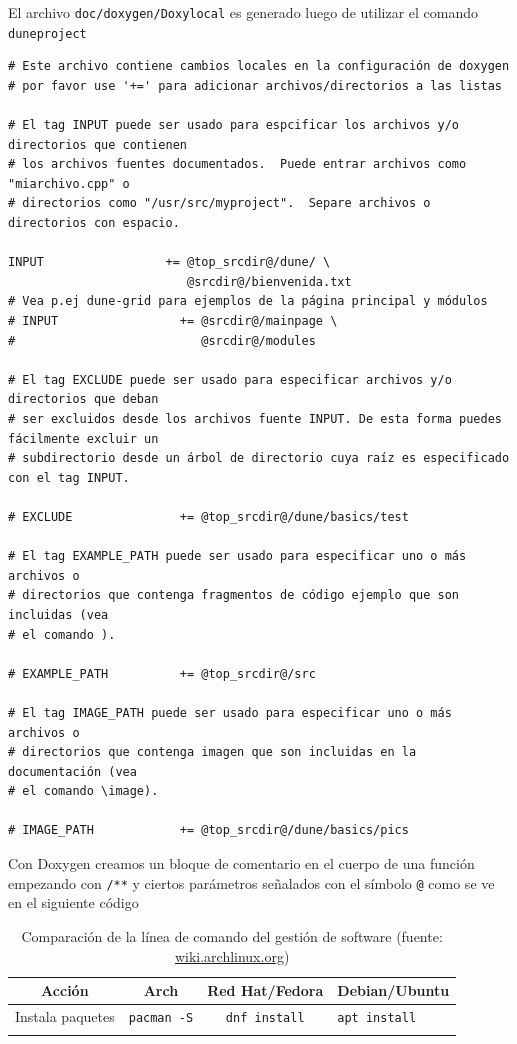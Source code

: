 \begin{frame}[fragile]
	El archivo \lstinline{doc/doxygen/Doxylocal} es generado luego de utilizar el comando \lstinline{duneproject}
	\begin{lstlisting}
# Este archivo contiene cambios locales en la configuración de doxygen
# por favor use '+=' para adicionar archivos/directorios a las listas

# El tag INPUT puede ser usado para espcificar los archivos y/o directorios que contienen  
# los archivos fuentes documentados.  Puede entrar archivos como "miarchivo.cpp" o
# directorios como "/usr/src/myproject".  Separe archivos o directorios con espacio.

INPUT                 += @top_srcdir@/dune/ \
                         @srcdir@/bienvenida.txt
# Vea p.ej dune-grid para ejemplos de la página principal y módulos
# INPUT                 += @srcdir@/mainpage \
#                          @srcdir@/modules

# El tag EXCLUDE puede ser usado para especificar archivos y/o directorios que deban
# ser excluidos desde los archivos fuente INPUT. De esta forma puedes fácilmente excluir un
# subdirectorio desde un árbol de directorio cuya raíz es especificado con el tag INPUT.

# EXCLUDE               += @top_srcdir@/dune/basics/test

# El tag EXAMPLE_PATH puede ser usado para especificar uno o más archivos o
# directorios que contenga fragmentos de código ejemplo que son incluidas (vea
# el comando ).

# EXAMPLE_PATH          += @top_srcdir@/src

# El tag IMAGE_PATH puede ser usado para especificar uno o más archivos o
# directorios que contenga imagen que son incluidas en la documentación (vea
# el comando \image).

# IMAGE_PATH            += @top_srcdir@/dune/basics/pics
\end{lstlisting}
\end{frame}

\begin{frame}[fragile]
	Con Doxygen creamos un bloque de comentario en el cuerpo de una función empezando con \lstinline{/**} y ciertos parámetros señalados con el símbolo \lstinline{@} como se ve en el siguiente código
\end{frame}

\begin{frame}[fragile]
	\begin{table}[ht!]
		\caption{Comparación de la línea de comando del gestión de software (fuente: \url{wiki.archlinux.org})}
		\centering\footnotesize
		\begin{tabular}{cccp{50pt}}
			\toprule
			Acción           & Arch                  & Red Hat/Fedora          & Debian/Ubuntu
			\tabularnewline
			\midrule
			Instala paquetes & \lstinline|pacman -S| & \lstinline|dnf install| & \lstinline|apt install|
			\tabularnewline
			\tabularnewline
			\bottomrule
		\end{tabular}
	\end{table}
\end{frame}

